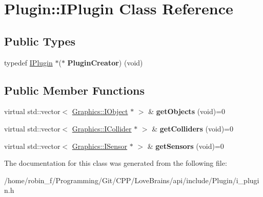 \hypertarget{class_plugin_1_1_i_plugin}{}\section{Plugin\+:\+:I\+Plugin Class Reference}
\label{class_plugin_1_1_i_plugin}
\subsection*{Public Types}
\begin{DoxyCompactItemize}
\item 
\hypertarget{class_plugin_1_1_i_plugin_acabdfce5c711ade0685f6d92b3200fd9}{}typedef \hyperlink{class_plugin_1_1_i_plugin}{I\+Plugin} $\ast$($\ast$ {\bfseries Plugin\+Creator}) (void)\label{class_plugin_1_1_i_plugin_acabdfce5c711ade0685f6d92b3200fd9}

\end{DoxyCompactItemize}
\subsection*{Public Member Functions}
\begin{DoxyCompactItemize}
\item 
\hypertarget{class_plugin_1_1_i_plugin_a87377dd4f3374d0cfe688af7bda54fc6}{}virtual std\+::vector$<$ \hyperlink{class_graphics_1_1_i_object}{Graphics\+::\+I\+Object} $\ast$ $>$ \& {\bfseries get\+Objects} (void)=0\label{class_plugin_1_1_i_plugin_a87377dd4f3374d0cfe688af7bda54fc6}

\item 
\hypertarget{class_plugin_1_1_i_plugin_a33a2f401e72044222692bd0dd2f93c3b}{}virtual std\+::vector$<$ \hyperlink{class_graphics_1_1_i_collider}{Graphics\+::\+I\+Collider} $\ast$ $>$ \& {\bfseries get\+Colliders} (void)=0\label{class_plugin_1_1_i_plugin_a33a2f401e72044222692bd0dd2f93c3b}

\item 
\hypertarget{class_plugin_1_1_i_plugin_af37b47e4aeb1b3c457cb58328b83b314}{}virtual std\+::vector$<$ \hyperlink{class_graphics_1_1_i_sensor}{Graphics\+::\+I\+Sensor} $\ast$ $>$ \& {\bfseries get\+Sensors} (void)=0\label{class_plugin_1_1_i_plugin_af37b47e4aeb1b3c457cb58328b83b314}

\end{DoxyCompactItemize}


The documentation for this class was generated from the following file\+:\begin{DoxyCompactItemize}
\item 
/home/robin\+\_\+f/\+Programming/\+Git/\+C\+P\+P/\+Love\+Brains/api/include/\+Plugin/i\+\_\+plugin.\+h\end{DoxyCompactItemize}
